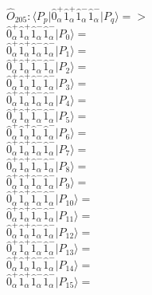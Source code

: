 \documentclass[14pt]{article}
\begin{document}
    $\hat{O}_{205}:  \langle{P_p}\vert \hat{0}_{\alpha}^{+}\hat{1}_{\alpha}^{+}\hat{1}_{\alpha}^{-}\hat{1}_{\alpha}^{-} \vert{P_q}\rangle => $ \\ 
    $ \hat{0}_{\alpha}^{+}\hat{1}_{\alpha}^{+}\hat{1}_{\alpha}^{-}\hat{1}_{\alpha}^{-} \vert{P_{0}}\rangle =  $ \\ 
    $ \hat{0}_{\alpha}^{+}\hat{1}_{\alpha}^{+}\hat{1}_{\alpha}^{-}\hat{1}_{\alpha}^{-} \vert{P_{1}}\rangle =  $ \\ 
    $ \hat{0}_{\alpha}^{+}\hat{1}_{\alpha}^{+}\hat{1}_{\alpha}^{-}\hat{1}_{\alpha}^{-} \vert{P_{2}}\rangle =  $ \\ 
    $ \hat{0}_{\alpha}^{+}\hat{1}_{\alpha}^{+}\hat{1}_{\alpha}^{-}\hat{1}_{\alpha}^{-} \vert{P_{3}}\rangle =  $ \\ 
    $ \hat{0}_{\alpha}^{+}\hat{1}_{\alpha}^{+}\hat{1}_{\alpha}^{-}\hat{1}_{\alpha}^{-} \vert{P_{4}}\rangle =  $ \\ 
    $ \hat{0}_{\alpha}^{+}\hat{1}_{\alpha}^{+}\hat{1}_{\alpha}^{-}\hat{1}_{\alpha}^{-} \vert{P_{5}}\rangle =  $ \\ 
    $ \hat{0}_{\alpha}^{+}\hat{1}_{\alpha}^{+}\hat{1}_{\alpha}^{-}\hat{1}_{\alpha}^{-} \vert{P_{6}}\rangle =  $ \\ 
    $ \hat{0}_{\alpha}^{+}\hat{1}_{\alpha}^{+}\hat{1}_{\alpha}^{-}\hat{1}_{\alpha}^{-} \vert{P_{7}}\rangle =  $ \\ 
    $ \hat{0}_{\alpha}^{+}\hat{1}_{\alpha}^{+}\hat{1}_{\alpha}^{-}\hat{1}_{\alpha}^{-} \vert{P_{8}}\rangle =  $ \\ 
    $ \hat{0}_{\alpha}^{+}\hat{1}_{\alpha}^{+}\hat{1}_{\alpha}^{-}\hat{1}_{\alpha}^{-} \vert{P_{9}}\rangle =  $ \\ 
    $ \hat{0}_{\alpha}^{+}\hat{1}_{\alpha}^{+}\hat{1}_{\alpha}^{-}\hat{1}_{\alpha}^{-} \vert{P_{10}}\rangle =  $ \\ 
    $ \hat{0}_{\alpha}^{+}\hat{1}_{\alpha}^{+}\hat{1}_{\alpha}^{-}\hat{1}_{\alpha}^{-} \vert{P_{11}}\rangle =  $ \\ 
    $ \hat{0}_{\alpha}^{+}\hat{1}_{\alpha}^{+}\hat{1}_{\alpha}^{-}\hat{1}_{\alpha}^{-} \vert{P_{12}}\rangle =  $ \\ 
    $ \hat{0}_{\alpha}^{+}\hat{1}_{\alpha}^{+}\hat{1}_{\alpha}^{-}\hat{1}_{\alpha}^{-} \vert{P_{13}}\rangle =  $ \\ 
    $ \hat{0}_{\alpha}^{+}\hat{1}_{\alpha}^{+}\hat{1}_{\alpha}^{-}\hat{1}_{\alpha}^{-} \vert{P_{14}}\rangle =  $ \\ 
    $ \hat{0}_{\alpha}^{+}\hat{1}_{\alpha}^{+}\hat{1}_{\alpha}^{-}\hat{1}_{\alpha}^{-} \vert{P_{15}}\rangle =  $ \\ 
    
\end{document}
